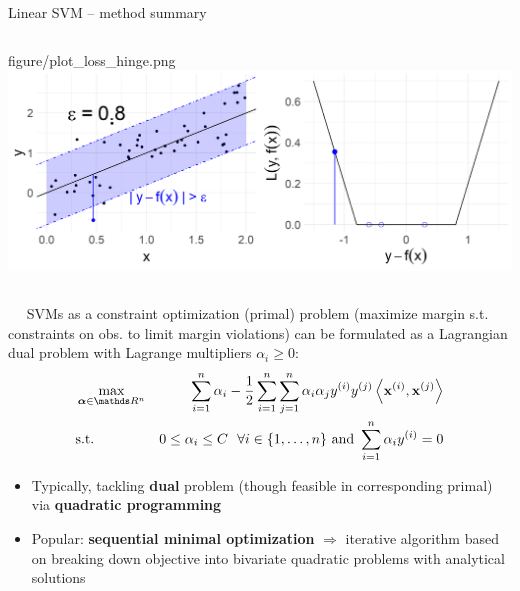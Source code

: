 \begin{vbframe}{Linear SVM -- method summary}
\begin{columns}[T, totalwidth = \textwidth]
\begin{column}{0.4\textwidth}
{  figure/plot_loss_hinge.png}
  \includegraphics[height=\textwidth, keepaspectratio=true]{
  figure/loss_eps_insensitive.png}

\end{column}
\end{columns}

\medskip

 ~~ %
SVMs as a constraint optimization (primal) problem (maximize margin s.t. constraints on obs. to limit margin violations) can be formulated as a Lagrangian dual problem with Lagrange multipliers $\alpha_i \geq 0$: %
\begin{eqnarray*}
    & \max\limits_{\alphav \in \R^n} & \dualobj \\
    & \text{s.t. } & 0 \le \alpha_i \le C ~~ \forall i \in \nset \text{ and } \sum_{i=1}^n \alpha_i \yi = 0
\end{eqnarray*}

\framebreak


\begin{itemize}
  \item Typically, tackling \textbf{dual} problem (though feasible 
  in corresponding primal) via \textbf{quadratic programming}
  \item Popular: \textbf{sequential minimal optimization} $\Rightarrow$ 
  iterative algorithm based on breaking down objective into bivariate quadratic 
  problems with analytical solutions
\end{itemize}
\medskip


\end{vbframe}
